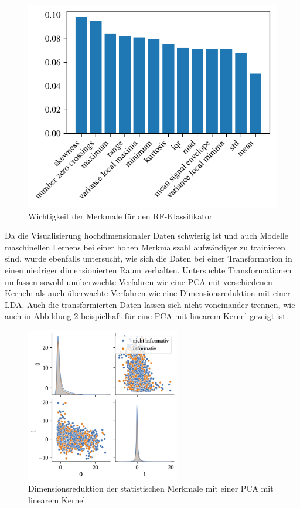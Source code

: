 \begin{figure}[H]
	\centering
	\includegraphics[scale=0.95]{pic/rf-cl-statistical.pdf}
	\caption{Wichtigkeit der Merkmale für den \ac{RF}-Klassifikator}
	\label{fig:rf-statistical-importances}
\end{figure}

Da die Visualisierung hochdimensionaler Daten schwierig ist und auch Modelle maschinellen Lernens bei einer hohen Merkmalszahl aufwändiger zu trainieren sind, wurde ebenfalls untersucht, wie sich die Daten bei einer Transformation in einen niedriger dimensionierten Raum verhalten. Untersuchte Transformationen umfassen sowohl unüberwachte Verfahren wie eine \ac{PCA} mit verschiedenen Kerneln als auch überwachte Verfahren wie eine Dimensionsreduktion mit einer \ac{LDA}. Auch die transformierten Daten lassen sich nicht voneinander trennen, wie auch in Abbildung \ref{fig:dim-red-statistical} beispielhaft für eine \ac{PCA} mit linearem Kernel gezeigt ist.


 \begin{figure}[H]
 	\centering
 	\includegraphics[width=0.6\textwidth]{pic/statistical-pca-lin.png}
	\caption{Dimensionsreduktion der statistischen Merkmale mit einer \ac{PCA} mit linearem Kernel}
	\label{fig:dim-red-statistical}
\end{figure}

